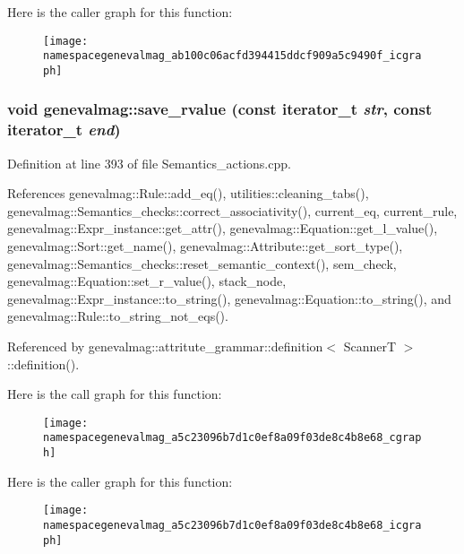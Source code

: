 Here is the caller graph for this function:\nopagebreak
\begin{figure}[H]
\begin{center}
\leavevmode
\texttt{[image: namespacegenevalmag\_ab100c06acfd394415ddcf909a5c9490f\_icgraph]}
\end{center}
\end{figure}


\hypertarget{namespacegenevalmag_a5c23096b7d1c0ef8a09f03de8c4b8e68}{
\subsubsection[{save\_\-rvalue}]{\setlength{\rightskip}{0pt plus 5cm}void genevalmag::save\_\-rvalue (const iterator\_\-t {\em str}, \/  const iterator\_\-t {\em end})}}
\label{namespacegenevalmag_a5c23096b7d1c0ef8a09f03de8c4b8e68}


Definition at line 393 of file Semantics\_\-actions.cpp.



References genevalmag::Rule::add\_\-eq(), utilities::cleaning\_\-tabs(), genevalmag::Semantics\_\-checks::correct\_\-associativity(), current\_\-eq, current\_\-rule, genevalmag::Expr\_\-instance::get\_\-attr(), genevalmag::Equation::get\_\-l\_\-value(), genevalmag::Sort::get\_\-name(), genevalmag::Attribute::get\_\-sort\_\-type(), genevalmag::Semantics\_\-checks::reset\_\-semantic\_\-context(), sem\_\-check, genevalmag::Equation::set\_\-r\_\-value(), stack\_\-node, genevalmag::Expr\_\-instance::to\_\-string(), genevalmag::Equation::to\_\-string(), and genevalmag::Rule::to\_\-string\_\-not\_\-eqs().



Referenced by genevalmag::attritute\_\-grammar::definition$<$ ScannerT $>$::definition().



Here is the call graph for this function:\nopagebreak
\begin{figure}[H]
\begin{center}
\leavevmode
\texttt{[image: namespacegenevalmag\_a5c23096b7d1c0ef8a09f03de8c4b8e68\_cgraph]}
\end{center}
\end{figure}




Here is the caller graph for this function:\nopagebreak
\begin{figure}[H]
\begin{center}
\leavevmode
\texttt{[image: namespacegenevalmag\_a5c23096b7d1c0ef8a09f03de8c4b8e68\_icgraph]}
\end{center}
\end{figure}


